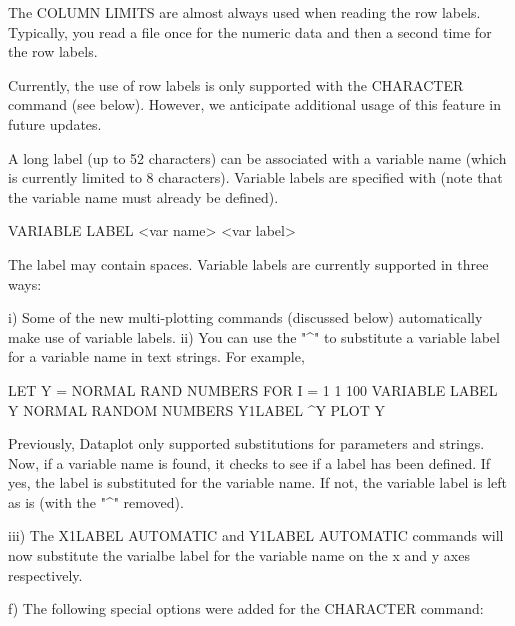 {       The COLUMN LIMITS are almost always used when reading the
       row labels.  Typically, you read a file once for the
       numeric data and then a second time for the row labels.

       Currently, the use of row labels is only supported
       with the CHARACTER command (see below).  However, we
       anticipate additional usage of this feature in future
       updates.

       A long label (up to 52 characters) can be associated with a
       variable name (which is currently limited to 8 characters).
       Variable labels are specified with (note that the variable
       name must already be defined).

           VARIABLE LABEL <var name>  <var label>

       The label may contain spaces.  Variable labels are currently
       supported in three ways:

        i) Some of the new multi-plotting commands (discussed
           below) automatically make use of variable labels.
       ii) You can use the "^" to substitute a variable label
           for a variable name in text strings.  For example,

              LET Y = NORMAL RAND NUMBERS FOR I = 1 1 100
              VARIABLE LABEL Y NORMAL RANDOM NUMBERS
              Y1LABEL ^Y
              PLOT Y

           Previously, Dataplot only supported substitutions
           for parameters and strings.  Now, if a variable name
           is found, it checks to see if a label has been defined.
           If yes, the label is substituted for the variable name.
           If not, the variable label is left as is (with the
           "^" removed).
       
      iii) The X1LABEL AUTOMATIC and Y1LABEL AUTOMATIC commands
           will now substitute the varialbe label for the variable
           name on the x and y axes respectively.

    f) The following special options were added for the
       CHARACTER command:
    
}
